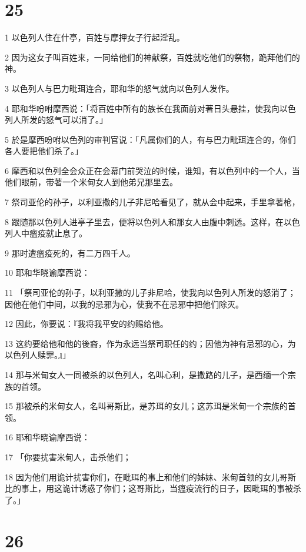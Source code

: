 \chapter{25}

\par 1 以色列人住在什亭，百姓与摩押女子行起淫乱。
\par 2 因为这女子叫百姓来，一同给他们的神献祭，百姓就吃他们的祭物，跪拜他们的神。
\par 3 以色列人与巴力毗珥连合，耶和华的怒气就向以色列人发作。
\par 4 耶和华吩咐摩西说：「将百姓中所有的族长在我面前对著日头悬挂，使我向以色列人所发的怒气可以消了。」
\par 5 於是摩西吩咐以色列的审判官说：「凡属你们的人，有与巴力毗珥连合的，你们各人要把他们杀了。」
\par 6 摩西和以色列全会众正在会幕门前哭泣的时候，谁知，有以色列中的一个人，当他们眼前，带著一个米甸女人到他弟兄那里去。
\par 7 祭司亚伦的孙子，以利亚撒的儿子非尼哈看见了，就从会中起来，手里拿著枪，
\par 8 跟随那以色列人进亭子里去，便将以色列人和那女人由腹中刺透。这样，在以色列人中瘟疫就止息了。
\par 9 那时遭瘟疫死的，有二万四千人。
\par 10 耶和华晓谕摩西说：
\par 11 「祭司亚伦的孙子，以利亚撒的儿子非尼哈，使我向以色列人所发的怒消了；因他在他们中间，以我的忌邪为心，使我不在忌邪中把他们除灭。
\par 12 因此，你要说：『我将我平安的约赐给他。
\par 13 这约要给他和他的後裔，作为永远当祭司职任的约；因他为神有忌邪的心，为以色列人赎罪。』」
\par 14 那与米甸女人一同被杀的以色列人，名叫心利，是撒路的儿子，是西缅一个宗族的首领。
\par 15 那被杀的米甸女人，名叫哥斯比，是苏珥的女儿；这苏珥是米甸一个宗族的首领。
\par 16 耶和华晓谕摩西说：
\par 17 「你要扰害米甸人，击杀他们；
\par 18 因为他们用诡计扰害你们，在毗珥的事上和他们的姊妹、米甸首领的女儿哥斯比的事上，用这诡计诱惑了你们；这哥斯比，当瘟疫流行的日子，因毗珥的事被杀了。」

\chapter{26}

